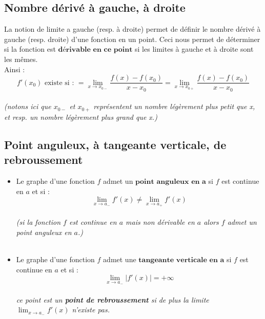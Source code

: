 \documentclass[12pt, a4paper]{book}
\begin{document}
\subsection{Nombre dérivé à gauche, à droite}
    La notion de limite a gauche (resp. à droite) permet de définir le nombre dérivé à gauche (resp. droite) d'une fonction en un point.
    Ceci nous permet de déterminer si la fonction est $\textbf{dérivable en ce point}$ si les limites à gauche et à droite sont les mêmes.\\
    Ainsi :
    $$
    \boxed{
    f'(x_{0}) \text{ existe si : }= \lim_{x \to x_{0-}} \frac{f(x)-f(x_0)}{x-x_0} = \lim_{x \to x_{0+}} \frac{f(x)-f(x_0)}{x-x_0}
    }
    $$\\
    \textit{(notons ici que $x_{0-}$ et $x_{0+}$ représentent un nombre légèrement plus petit que x, et  resp. un nombre légèrement plus grand que x.)}
\subsection{Point anguleux, à tangeante verticale, de rebroussement}
\begin{itemize}

    \item Le graphe d'une fonction $f$ admet un $\textbf{point anguleux en a}$ si $f$ est continue en $a$ et si :\\
$$\boxed{
\lim_{x \to a_{-}}f'(x) \not = \lim_{x \to a_{+}}f'(x)
}
$$\\
\textit{(si la fonction $f$ est continue en $a$ mais non dérivable en $a$ alors $f$ admet un point anguleux en $a$.)}\\
\\
\item Le graphe d'une fonction $f$ admet une $\textbf{tangeante verticale en a}$ si $f$ est continue en $a$ et si :\\
$$\boxed{
\lim_{x \to a_{-} } \lvert f'(x) \rvert = +\infty
}
$$\\
\textit{ce point est un \textbf{point de rebroussement} si de plus la limite $\lim_{x \to a_{-}}f'(x) $ n'existe pas.}\\
\\
\end{itemize}
\end{document}
